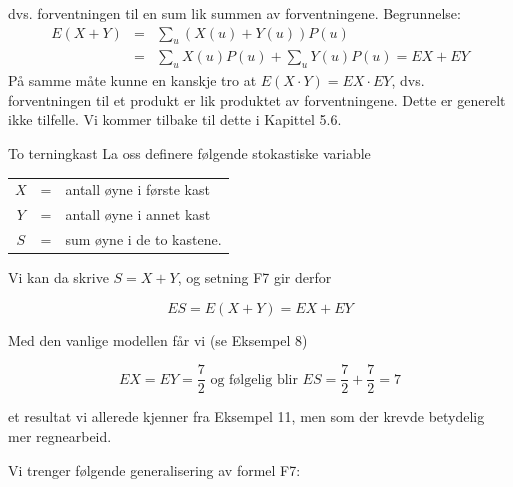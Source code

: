 \begin{center} \framebox[10cm]{\begin{minipage}{9cm}
\[ \mbox{\ \ \ F7. \ \ \ \ } E(X+Y)=EX+EY   \]
\mbox{}
\end{minipage}} \end{center}
dvs. forventningen til en sum lik summen av forventningene.
\noindent Begrunnelse:
\begin{eqnarray*}
 E(X+Y)&=&\sum_{u}(X(u)+Y(u))P(u) \\
       &=&\sum_{u}X(u)P(u)+\sum_{u}Y(u)P(u)=EX+EY
\end{eqnarray*}
\noindent På samme måte kunne en kanskje tro at
 $E(X\cdot Y)=EX\cdot EY$,
dvs. forventningen til et produkt er lik produktet av
forventningene. Dette er generelt ikke tilfelle. Vi kommer
tilbake til dette i Kapittel 5.6. \\

\begin{eksempel}{To terningkast}
La oss definere følgende stokastiske variable
\begin{center}
\begin{tabular}{ccl}
     $X$ &=& antall øyne i første kast \\
     $Y$ &=& antall øyne i annet kast\\
     $S$ &=& sum øyne i de to kastene.
\end{tabular}
\end{center}
\noindent Vi kan da skrive $S=X+Y$, og setning F7 gir derfor

\[     ES=E(X+Y)=EX+EY \]

\noindent Med den vanlige modellen får vi (se Eksempel 8)

\[ EX=EY=\frac{7}{2} \mbox{\ \ og følgelig blir \ }
                              ES=\frac{7}{2}+\frac{7}{2}=7 \]

\noindent et resultat vi allerede kjenner fra Eksempel 11, men som der
krevde betydelig mer regnearbeid.
\end{eksempel}

  Vi trenger følgende generalisering av formel F7:

\begin{center}  \end{center}

